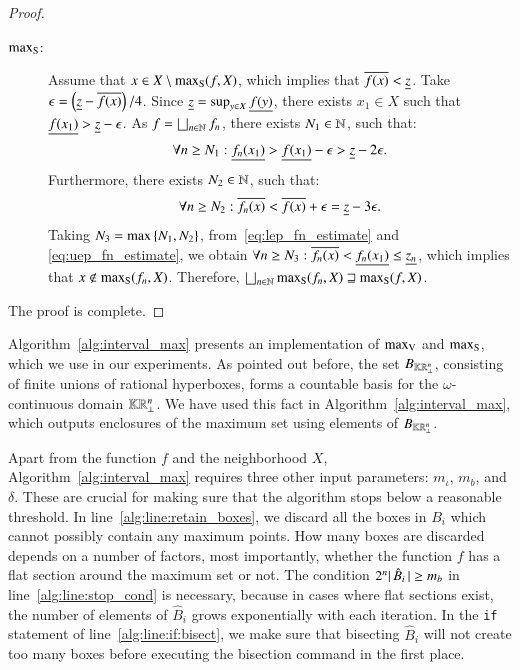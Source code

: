\documentclass[11pt,times]{article}
\begin{document}
\begin{proof}
\begin{description}
  
\item[$\maxS$:] Assume that $x \in X \setminus \maxS(f,X)$, which
  implies that $\uep[f(x)] < \lep[z]$. Take
  $\epsilon = \left(\lep[z] - \uep[f(x)]\right)/4$. Since
  $\lep[z] = \sup_{y \in X} \lep[f(y)]$, there exists $x_1 \in X$ such
  that $\lep[f(x_1)] > \lep[z] - \epsilon$. As
  $f = \bigsqcup_{n \in \N} f_n$, there exists $N_1 \in \N$, such
  that:
  \begin{equation}
    \label{eq:lep_fn_estimate}
    \forall n \geq N_1: \lep[f_n(x_1)] > \lep[f(x_1)] - \epsilon >
    \lep[z] - 2\epsilon.  
  \end{equation}
  Furthermore, there exists $N_2 \in \N$, such that:
  \begin{equation}
    \label{eq:uep_fn_estimate}
    \forall n \geq
    N_2: \uep[f_n(x)] < \uep[f(x)] + \epsilon = \lep[z] - 3\epsilon.
  \end{equation}
  Taking $N_3 = \max\set{N_1,N_2}$, from~\eqref{eq:lep_fn_estimate}
  and \eqref{eq:uep_fn_estimate}, we obtain
  $\forall n \geq N_3: \uep[f_n(x)] < \lep[f_n(x_1)] \leq \lep[z_n]$,
  which implies that $x \not \in \maxS(f_n,X)$. Therefore,
  $\bigsqcup_{n \in \N} \maxS(f_n,X) \sqsupseteq \maxS(f,X)$.
\end{description}
%
\noindent
The proof is complete.
\end{proof}


Algorithm~\ref{alg:interval_max} presents an implementation of $\maxV$
and $\maxS$, which we use in our experiments. As pointed out before,
the set $B_{\kCPPO{\R^n\lift}}$, consisting of finite unions of
rational hyperboxes, forms a countable basis for the
$\omega$-continuous domain $\kCPPO{\R^n\lift}$. We have used this fact
in Algorithm~\ref{alg:interval_max}, which outputs enclosures of the
maximum set using elements of $B_{\kCPPO{\R^n\lift}}$.

Apart from the function $f$ and the neighborhood $X$,
Algorithm~\ref{alg:interval_max} requires three other input
parameters: $m_{\iota}$, $m_b$, and $\delta$. These are crucial for making
sure that the algorithm stops below a reasonable threshold. In
line~\ref{alg:line:retain_boxes}, we discard all the boxes in $B_i$
which cannot possibly contain any maximum points. How many boxes are
discarded depends on a number of factors, most importantly, whether
the function $f$ has a flat section around the maximum set or not. The
condition $2^n\absn{\hat{B}_i} \geq m_b$ in
line~\ref{alg:line:stop_cond} is necessary, because in cases where
flat sections exist, the number of elements of $\hat{B}_i$ grows
exponentially with each iteration. In the \texttt{if} statement of
line~\ref{alg:line:if:bisect}, we make sure that bisecting $\hat{B}_i$
will not create too many boxes before executing the bisection command
in the first place.
\end{document}
